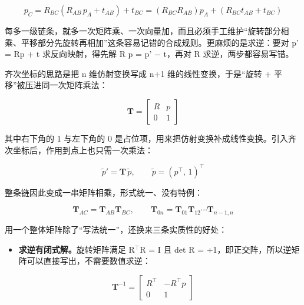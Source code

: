 \documentclass[11pt,a4paper]{ctexart}
\begin{document}
\begin{equation}p_C = R_{BC}\left(R_{AB}\,p_A + t_{AB}\right) + t_{BC}= \left(R_{BC}R_{AB}\right)p_A + \left(R_{BC}t_{AB} + t_{BC}\right)\end{equation}

每多一级链条，就多一次矩阵乘、一次向量加，而且必须手工维护“旋转部分相乘、平移部分先旋转再相加”这条容易记错的合成规则。更麻烦的是求逆：要对 p' = Rp + t 求反向映射，得先解 R p = p' $-$ t，再对 R 求逆，两步都容易写错。\par

齐次坐标的思路是把 n 维仿射变换写成 n+1 维的线性变换，于是“旋转 + 平移”被压进同一次矩阵乘法：\par

\begin{equation}\mathbf{T}= \begin{bmatrix}R & p \\ 0 & 1\end{bmatrix}\end{equation}

其中右下角的 1 与左下角的 0 是占位项，用来把仿射变换补成线性变换。引入齐次坐标后，作用到点上也只需一次乘法：\par

\begin{equation}\tilde{p}'=\mathbf{T}\,\tilde{p},\qquad \tilde{p}=\left(p^{\top},\,1\right)^{\top}\end{equation}

整条链因此变成一串矩阵相乘，形式统一、没有特例：\par

\begin{equation}\mathbf{T}_{AC}=\mathbf{T}_{AB}\mathbf{T}_{BC},\qquad \mathbf{T}_{0n}=\mathbf{T}_{01}\mathbf{T}_{12}\cdots\mathbf{T}_{n-1,n}\end{equation}

用一个整体矩阵除了“写法统一”，还换来三条实质性的好处：\par

\begin{itemize}[leftmargin=1.6em,itemsep=0.15em,topsep=0.25em]

\item \textbf{求逆有闭式解。}旋转矩阵满足 R$^{\top}$R = I 且 det R = +1，即正交阵，所以逆矩阵可以直接写出，不需要数值求逆：

\end{itemize}

\begin{equation}\mathbf{T}^{-1}= \begin{bmatrix}R^{\top} & -R^{\top}p \\ 0 & 1\end{bmatrix}\end{equation}
\end{document}
